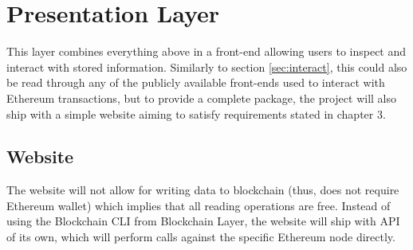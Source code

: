 \section{Presentation Layer}
This layer combines everything above in a front-end allowing users to inspect and interact with stored information. Similarly to section \ref{sec:interact}, this could also be read through any of the publicly available front-ends used to interact with Ethereum transactions, but to provide a complete package, the project will also ship with a simple website aiming to satisfy requirements stated in chapter 3.
\subsection{Website}
The website will not allow for writing data to blockchain (thus, does not require Ethereum wallet) which implies that all reading operations are free. Instead of using the Blockchain CLI from Blockchain Layer, the website will ship with API of its own, which will perform calls against the specific Ethereum node directly.
